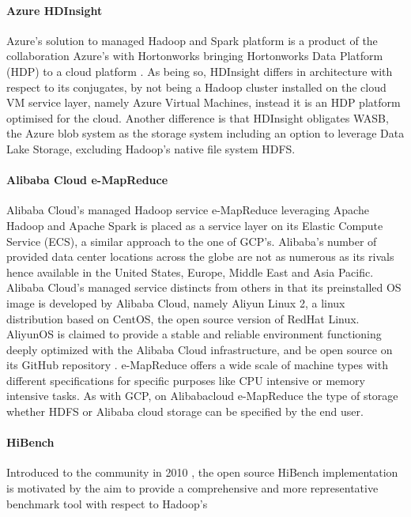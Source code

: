 \documentclass[review]{elsarticle}
\begin{document}
\paragraph{Azure HDInsight \cite{noauthor_azure_nodate}}Azure's solution to managed Hadoop and Spark platform is a product of the collaboration Azure's with Hortonworks bringing Hortonworks Data Platform (HDP) to a cloud platform \cite{noauthor_azuravail_nodate}. As being so, HDInsight differs in architecture with respect to its conjugates, by not being a Hadoop cluster installed on the cloud VM service layer, namely Azure Virtual Machines, instead it is an HDP platform optimised for the cloud. Another difference is that HDInsight obligates WASB, the Azure blob system as the storage system including an option to leverage Data Lake Storage, excluding Hadoop's native file system HDFS. 

\paragraph{Alibaba Cloud e-MapReduce \cite{noauthor_what_nodate}}Alibaba Cloud's managed Hadoop service e-MapReduce leveraging Apache Hadoop and Apache Spark is placed as a service layer on its Elastic Compute Service (ECS), a similar approach to the one of GCP's. Alibaba's number of provided data center locations across the globe are not as numerous as its rivals hence available in the United States, Europe, Middle East and Asia Pacific. Alibaba Cloud's managed service distincts from others in that its preinstalled OS image is developed by Alibaba Cloud, namely Aliyun Linux 2, a linux distribution based on CentOS, the open source version of RedHat Linux. AliyunOS is claimed to provide a stable and reliable environment functioning deeply optimized with the Alibaba Cloud infrastructure, and be open source on its GitHub repository \cite{noauthor_alibaba_nodate}. e-MapReduce offers a wide scale of machine types with different specifications for specific purposes like CPU intensive or memory intensive tasks. As with GCP, on Alibabacloud e-MapReduce the type of storage whether HDFS or Alibaba cloud storage can be specified by the end user.

\paragraph{HiBench \cite{noauthor_intel-bigdatahibench_2021}}Introduced to the community in 2010 \cite{huang_hibench_2010}, the open source HiBench implementation is motivated by the aim to provide a comprehensive and more representative benchmark tool with respect to Hadoop's 
\end{document}
